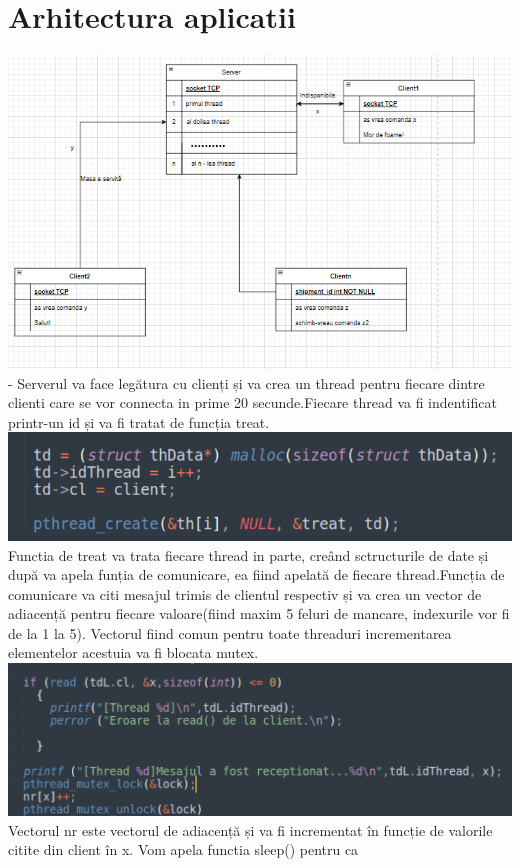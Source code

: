 \documentclass{llncs}
\begin{document}
\section{Arhitectura aplicatii}
\includegraphics{diagrama.png}\\
- Serverul va face legătura cu clienți și va crea un thread pentru fiecare dintre clienti care se vor connecta in prime 20 secunde.Fiecare thread va fi indentificat printr-un id și va fi tratat de funcția treat.\\
\includegraphics{cod1.png}\\Functia de treat va trata fiecare thread in parte, creând sctructurile de date și după va apela funția de comunicare, ea fiind apelată de fiecare thread.Funcția de comunicare va citi mesajul trimis de clientul respectiv și va crea un vector de adiacență pentru fiecare valoare(fiind maxim 5 feluri de mancare, indexurile vor fi de la 1 la 5). Vectorul fiind comun pentru toate threaduri incrementarea elementelor acestuia va fi blocata mutex.\\
\includegraphics{cod2.png}\\Vectorul  nr este vectorul de adiacență și va fi incrementat în funcție de valorile citite din client în x. Vom apela functia sleep() pentru ca 
\end{document}
